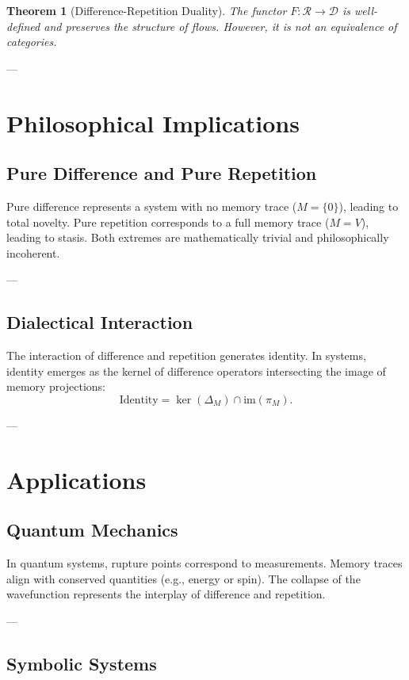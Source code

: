 \documentclass[12pt]{article}
\theoremstyle{plain}
\newtheorem{theorem}{Theorem}[section]
\theoremstyle{definition}
\begin{document}
\begin{theorem}[Difference-Repetition Duality]
The functor \( F: \mathscr{R} \to \mathscr{D} \) is well-defined and preserves the structure of flows. However, it is not an equivalence of categories.
\end{theorem}

---

\section{Philosophical Implications}

\subsection{Pure Difference and Pure Repetition}

Pure difference represents a system with no memory trace (\( M = \{0\} \)), leading to total novelty. Pure repetition corresponds to a full memory trace (\( M = V \)), leading to stasis. Both extremes are mathematically trivial and philosophically incoherent.

---

\subsection{Dialectical Interaction}

The interaction of difference and repetition generates identity. In systems, identity emerges as the kernel of difference operators intersecting the image of memory projections:
\[
\text{Identity} = \ker(\Delta_M) \cap \text{im}(\pi_M).
\]

---

\section{Applications}

\subsection{Quantum Mechanics}

In quantum systems, rupture points correspond to measurements. Memory traces align with conserved quantities (e.g., energy or spin). The collapse of the wavefunction represents the interplay of difference and repetition.

---

\subsection{Symbolic Systems}
\end{document}
